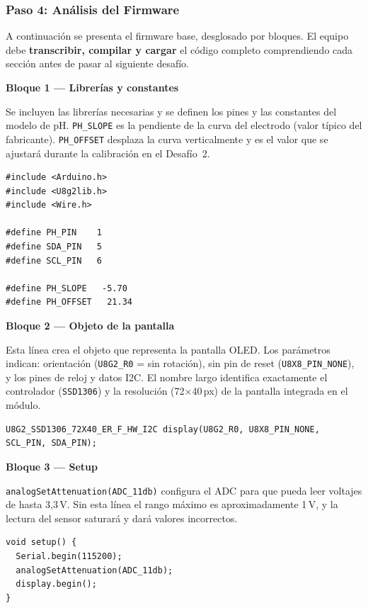 \documentclass[12pt,leqno]{article}
\begin{document}
\pagebreak
\subsubsection*{Paso 4: An\'alisis del Firmware}

A continuaci\'on se presenta el firmware base, desglosado por bloques. El equipo
debe \textbf{transcribir, compilar y cargar} el c\'odigo completo comprendiendo
cada secci\'on antes de pasar al siguiente desaf\'io.

\bigskip
\noindent\textbf{Bloque 1 --- Librer\'ias y constantes}

\smallskip
\noindent Se incluyen las librer\'ias necesarias y se definen los pines y las
constantes del modelo de pH. \texttt{PH\_SLOPE} es la pendiente de la curva del
electrodo (valor t\'ipico del fabricante). \texttt{PH\_OFFSET} desplaza la curva
verticalmente y es el valor que se ajustar\'a durante la calibraci\'on en el
Desaf\'io~2.

\begin{lstlisting}
#include <Arduino.h>
#include <U8g2lib.h>
#include <Wire.h>

#define PH_PIN    1
#define SDA_PIN   5
#define SCL_PIN   6

#define PH_SLOPE   -5.70
#define PH_OFFSET   21.34
\end{lstlisting}

\bigskip
\noindent\textbf{Bloque 2 --- Objeto de la pantalla}

\smallskip
\noindent Esta l\'inea crea el objeto que representa la pantalla OLED. Los
par\'ametros indican: orientaci\'on (\texttt{U8G2\_R0} = sin rotaci\'on), sin pin
de reset (\texttt{U8X8\_PIN\_NONE}), y los pines de reloj y datos I2C. El nombre
largo identifica exactamente el controlador (\texttt{SSD1306}) y la resoluci\'on
(72$\times$40\,px) de la pantalla integrada en el m\'odulo.

\begin{lstlisting}
U8G2_SSD1306_72X40_ER_F_HW_I2C display(U8G2_R0, U8X8_PIN_NONE, SCL_PIN, SDA_PIN);
\end{lstlisting}

\bigskip
\noindent\textbf{Bloque 3 --- Setup}

\smallskip
\noindent \texttt{analogSetAttenuation(ADC\_11db)} configura el ADC para que pueda
leer voltajes de hasta 3,3\,V. Sin esta l\'inea el rango m\'aximo es aproximadamente
1\,V, y la lectura del sensor saturar\'a y dar\'a valores incorrectos.

\begin{lstlisting}
void setup() {
  Serial.begin(115200);
  analogSetAttenuation(ADC_11db);
  display.begin();
}
\end{lstlisting}
\end{document}
